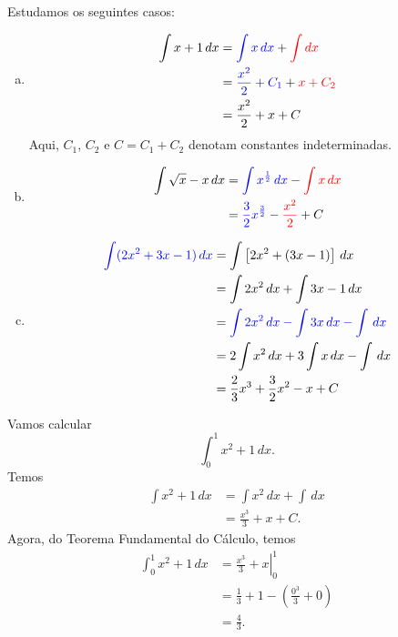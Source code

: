 \begin{ex}
  Estudamos os seguintes casos:
  \begin{enumerate}[a)]
  \item
    \begin{align}
      \int x + 1\,dx &= {\color{blue}\int x\,dx} + {\color{red}\int dx}\\
                     &= {\color{blue}\frac{x^2}{2} + C_1} + {\color{red}x + C_2}\\
                     &= \frac{x^2}{2} + x + C
    \end{align}
    Aqui, $C_1$, $C_2$ e $C = C_1+C_2$ denotam constantes indeterminadas.
  \item
    \begin{align}
      \int \sqrt{x} - x\,dx &= {\color{blue}\int x^{\frac{1}{2}}\,dx} - {\color{red}\int x\,dx}\\
                            &= {\color{blue}\frac{3}{2}x^{\frac{3}{2}}} - {\color{red}\frac{x^2}{2}} + C
    \end{align}
  \item
    \begin{align}
      {\color{blue}\int (2x^2 + 3x - 1)\,dx} &= \int \left[2x^2 + (3x - 1)\right]\,dx\\
                                             &= \int 2x^2\,dx + \int 3x - 1 \,dx \\
                                             &= {\color{blue}\int 2x^2\,dx - \int 3x\,dx - \int \,dx}\\
                                             &= 2\int x^2\,dx + 3\int x\,dx - \int \,dx\\
                                             &= \frac{2}{3}x^3 + \frac{3}{2}x^2 - x + C
    \end{align}
  \end{enumerate}
\end{ex}

\begin{ex}
  Vamos calcular
  \begin{equation}
    \int_{0}^1 x^2 + 1\,dx.
  \end{equation}
  Temos
  \begin{align}
    \int x^2 + 1\,dx &= \int x^2\,dx + \int \,dx\\
                     &= \frac{x^3}{3} + x + C.
  \end{align}
  Agora, do Teorema Fundamental do Cálculo, temos
  \begin{align}
    \int_0^1 x^2+1\,dx &= \left. \frac{x^3}{3} + x\right|_0^1 \\
                       &= \frac{1}{3} + 1 - \left(\frac{0^3}{3} + 0\right) \\
                       &= \frac{4}{3}.
  \end{align}
\end{ex}

